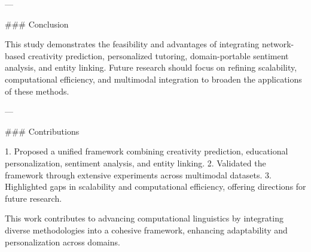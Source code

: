 ---

### Conclusion

This study demonstrates the feasibility and advantages of integrating network-based creativity prediction, personalized tutoring, domain-portable sentiment analysis, and entity linking. Future research should focus on refining scalability, computational efficiency, and multimodal integration to broaden the applications of these methods.

---

### Contributions

1. Proposed a unified framework combining creativity prediction, educational personalization, sentiment analysis, and entity linking.
2. Validated the framework through extensive experiments across multimodal datasets.
3. Highlighted gaps in scalability and computational efficiency, offering directions for future research.

This work contributes to advancing computational linguistics by integrating diverse methodologies into a cohesive framework, enhancing adaptability and personalization across domains.